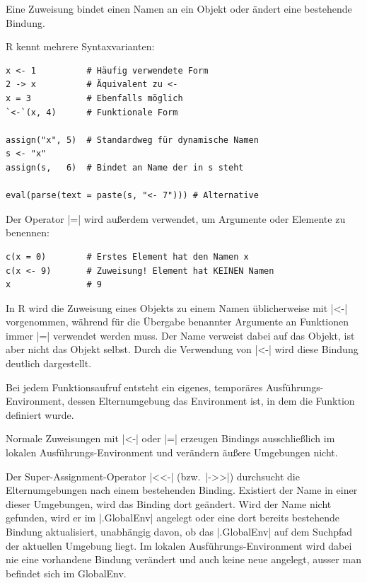 \documentclass[10pt,twocolumn]{scrartcl}
\renewcommand{\lstinline}{\mycoloredinline}
\begin{document}
Eine Zuweisung bindet einen Namen an ein Objekt oder ändert eine bestehende Bindung.

R kennt mehrere Syntaxvarianten:

\begin{lstlisting}
x <- 1          # Häufig verwendete Form
2 -> x          # Äquivalent zu <-
x = 3           # Ebenfalls möglich
`<-`(x, 4)      # Funktionale Form

assign("x", 5)  # Standardweg für dynamische Namen
s <- "x"
assign(s,   6)  # Bindet an Name der in s steht

eval(parse(text = paste(s, "<- 7"))) # Alternative
\end{lstlisting}

Der Operator \lstinline|=| wird außerdem verwendet, um Argumente oder Elemente zu benennen:

\begin{lstlisting}
c(x = 0)        # Erstes Element hat den Namen x
c(x <- 9)       # Zuweisung! Element hat KEINEN Namen
x               # 9
\end{lstlisting}

In R wird die Zuweisung eines Objekts zu einem Namen üblicherweise mit \lstinline|<-| vorgenommen, während für die Übergabe benannter Argumente an Funktionen immer \lstinline|=| verwendet werden muss. Der Name verweist dabei auf das Objekt, ist aber nicht das Objekt selbst. Durch die Verwendung von \lstinline|<-| wird  diese Bindung deutlich dargestellt.

Bei jedem Funktionsaufruf entsteht ein eigenes, temporäres Ausführungs-Environment, dessen Elternumgebung das Environment ist, in dem die Funktion definiert wurde.

Normale Zuweisungen mit \lstinline|<-| oder \lstinline|=| erzeugen Bindings ausschließlich im lokalen Ausführungs-Environment und verändern äußere Umgebungen nicht.

Der Super-Assignment-Operator \lstinline|<<-| (bzw.\ \lstinline|->>|) durchsucht die Elternumgebungen nach einem bestehenden Binding. 
Existiert der Name in einer dieser Umgebungen, wird das Binding dort geändert. 
Wird der Name nicht gefunden, wird er im \lstinline|.GlobalEnv| angelegt oder eine dort bereits bestehende Bindung aktualisiert, unabhängig davon, ob das \lstinline|.GlobalEnv| auf dem Suchpfad der aktuellen Umgebung liegt.
Im lokalen Ausführungs-Environment wird dabei nie eine vorhandene Bindung verändert und auch keine neue angelegt, ausser man befindet sich im GlobalEnv.
\end{document}
